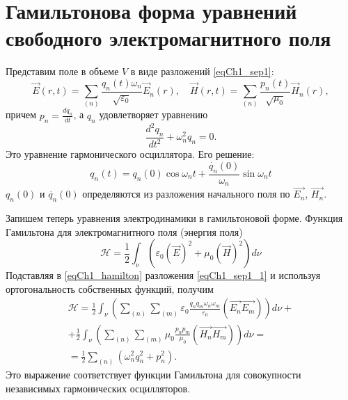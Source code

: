 \section{Гамильтонова форма уравнений свободного электромагнитного поля}
Представим поле в объеме  $V$  в виде разложений \eqref{eqCh1_sep1}:
\begin{equation}
\vec{E}\left(r, t\right) = \sum_{(n)}
\frac{q_n\left(t\right) \omega_n}{\sqrt{\varepsilon_0}} \vec{E}_n\left(r\right),
\quad
\vec{H}\left(r, t\right) = \sum_{(n)}
\frac{p_n\left(t\right)}{\sqrt{\mu_0}} \vec{H}_n\left(r\right),
\label{eqCh1_sep1_1}
\end{equation}
причем $p_n = \frac{d q_n}{d t}$, а $q_n$ удовлетворяет уравнению
\[
\frac{d^2 q_n}{d t^2} + \omega_n^2 q_n = 0.
\]
Это уравнение гармонического осциллятора. Его решение:
\begin{equation}
q_n\left(t\right) = q_n\left(0\right) \cos \omega_n t + 
\frac{\dot{q_n}\left(0\right)}{\omega_n} \sin \omega_n t 
\end{equation}
$q_n\left(0\right)$ и 
$\dot{q_n}\left(0\right)$ 
определяются из разложения начального поля по  
$\vec{E_n}$, $\vec{H_n}$.
 
Запишем теперь уравнения электродинамики в гамильтоновой
форме. Функция Гамильтона для электромагнитного поля 
(энергия поля)
\begin{equation}
\mathcal{H} = \frac{1}{2}
\int_{\nu}\left( \varepsilon_0\left(\vec{E}\right)^2 + \mu_0
\left(\vec{H}\right)^2\right) d\nu
\label{eqCh1_hamilton}
\end{equation}
Подставляя в \eqref{eqCh1_hamilton} разложения \eqref{eqCh1_sep1_1} и
используя ортогональность собственных функций, получим 
\begin{eqnarray}
\mathcal{H} = \frac{1}{2} 
\int_{\nu}\left( \sum_{(n)} \sum_{(m)}\varepsilon_0
\frac{q_n q_m \omega_n \omega_m}{\varepsilon_0}
\left( \vec{E_n} \vec{E_m}\right)
\right) d\nu +
\nonumber \\
+  \frac{1}{2} 
\int_{\nu}\left( \sum_{(n)} \sum_{(m)}\mu_0
\frac{p_n p_m}{\mu_0}
\left( \vec{H_n} \vec{H_m}\right)
\right) d\nu =
\nonumber \\
= \frac{1}{2}\sum_{(n)}\left(\omega_n^2 q_n^2 + p_n^2\right).
\end{eqnarray}
Это выражение соответствует функции Гамильтона для совокупности
независимых гармонических осцилляторов. 

